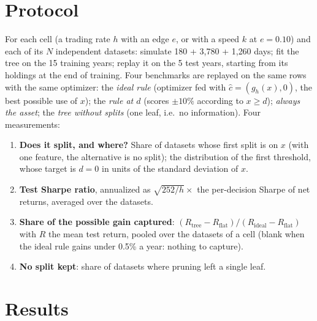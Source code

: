 \documentclass[11pt,a4paper]{article}
\newcommand{\1}{\mathbf{1}}
\begin{document}
\section{Protocol}\label{sec:protocol}
For each cell (a trading rate $h$ with an edge $e$, or with a speed $k$ at $e=0.10$) and each of its $N$ independent datasets: simulate 180 + 3{,}780 + 1{,}260 days; fit the tree on the 15 training years; replay it on the 5 test years, starting from its holdings at the end of training. Four benchmarks are replayed on the same rows with the same optimizer: the \emph{ideal rule} (optimizer fed with $\hat c=(g_h(x),0)$, the best possible use of $x$); the \emph{rule at $d$} (scores $\pm10\%$ according to $x\ge d$); \emph{always the asset}; the \emph{tree without splits} (one leaf, i.e.\ no information). Four measurements:
\begin{enumerate}\setlength{\itemsep}{1pt}
\item \textbf{Does it split, and where?} Share of datasets whose first split is on $x$ (with one feature, the alternative is no split); the distribution of the first threshold, whose target is $d=0$ in units of the standard deviation of $x$.
\item \textbf{Test Sharpe ratio}, annualized as $\sqrt{252/h}\times$ the per-decision Sharpe of net returns, averaged over the datasets.
\item \textbf{Share of the possible gain captured}: $(R_{\text{tree}}-R_{\text{flat}})/(R_{\text{ideal}}-R_{\text{flat}})$ with $R$ the mean test return, pooled over the datasets of a cell (blank when the ideal rule gains under 0.5\% a year: nothing to capture).
\item \textbf{No split kept}: share of datasets where pruning left a single leaf.
\end{enumerate}

\section{Results}\label{sec:results}
\end{document}
